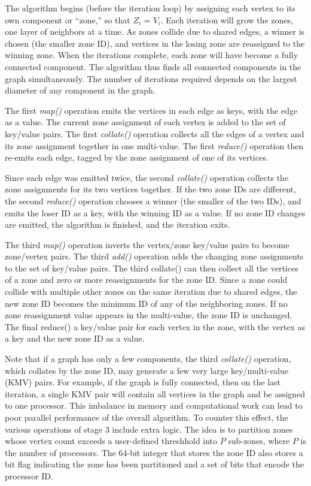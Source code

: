 The algorithm begins (before the iteration loop) by assigning each
vertex to its own component or ``zone,'' so that $Z_i$ = $V_i$.  Each
iteration will grow the zones, one layer of neighbors at a time.  As
zones collide due to shared edges, a winner is chosen (the smaller
zone ID), and vertices in the losing zone are reassigned to the
winning zone.  When the iterations complete, each zone will have
become a fully connected component.  The algorithm thus finds all
connected components in the graph simultaneously.  The number of
iterations required depends on the largest diameter of any component
in the graph.

The first {\it map()} operation emits the vertices in each edge as
keys, with the edge as a value.  The current zone assignment of each
vertex is added to the set of key/value pairs.  The first {\it
collate()} operation collects all the edges of a vertex and its zone
assignment together in one multi-value.  The first {\it reduce()}
operation then re-emits each edge, tagged by the zone assignment of
one of its vertices.

Since each edge was emitted twice, the second {\it collate()}
operation collects the zone assignments for its two vertices together.
If the two zone IDs are different, the second {\it reduce()} operation
chooses a winner (the smaller of the two IDs), and emits the loser ID as a
key, with the winning ID as a value.  If no zone ID changes are
emitted, the algorithm is finished, and the iteration exits.

The third {\it map()} operation inverts the vertex/zone key/value
pairs to become zone/vertex pairs.  The third {\it add()} operation
adds the changing zone assignments to the set of key/value pairs.  The
third collate() can then collect all the vertices of a zone and zero
or more reassignments for the zone ID.  Since a zone could collide
with multiple other zones on the same iteration due to shared edges,
the new zone ID becomes the minimum ID of any of the neighboring
zones.  If no zone reassignment value appears in the multi-value, the
zone ID is unchanged.  The final reduce() a key/value pair for each
vertex in the zone, with the vertex as a key and the new zone ID as a
value.

Note that if a graph has only a few components, the third {\it
collate()} operation, which collates by the zone ID, may generate a few
very large key/multi-value (KMV) pairs.  For example, if the graph is
fully connected, then on the last iteration, a single KMV pair will
contain all vertices in the graph and be assigned to one processor.
This imbalance in memory and computational work can lead to poor
parallel performance of the overall algorithm.  To counter this
effect, the various operations of stage 3 include extra logic.  The
idea is to partition zones whose vertex count exceeds a user-defined
threshhold into $P$ sub-zones, where $P$ is the number of processors.
The 64-bit integer that stores the zone ID also stores a bit flag
indicating the zone has been partitioned and a set of bits that encode
the processor ID.

